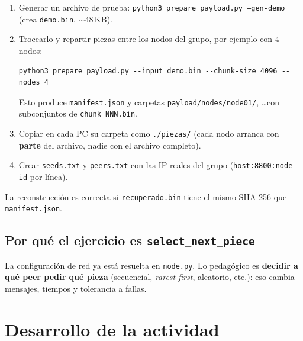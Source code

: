 \documentclass[12pt,a4paper]{article}
\begin{document}
\begin{enumerate}
    \item Generar un archivo de prueba: \texttt{python3 prepare\_payload.py --gen-demo} (crea \texttt{demo.bin}, $\sim$48\,KB).
    \item Trocearlo y repartir piezas entre los nodos del grupo, por ejemplo con 4 nodos:
    \begin{verbatim}
python3 prepare_payload.py --input demo.bin --chunk-size 4096 --nodes 4
    \end{verbatim}
    Esto produce \texttt{manifest.json} y carpetas \texttt{payload/nodes/node01/}, \ldots con subconjuntos de \texttt{chunk\_NNN.bin}.
    \item Copiar en cada PC su carpeta como \texttt{./piezas/} (cada nodo arranca con \textbf{parte} del archivo, nadie con el archivo completo).
    \item Crear \texttt{seeds.txt} y \texttt{peers.txt} con las IP reales del grupo (\texttt{host:8800:node-id} por línea).
\end{enumerate}

La reconstrucción es correcta si \texttt{recuperado.bin} tiene el mismo SHA-256 que \texttt{manifest.json}.

\subsection{Por qué el ejercicio es \texttt{select\_next\_piece}}

La configuración de red ya está resuelta en \texttt{node.py}. Lo pedagógico es \textbf{decidir a qué peer pedir qué pieza} (secuencial, \emph{rarest-first}, aleatorio, etc.): eso cambia mensajes, tiempos y tolerancia a fallas.

\section{Desarrollo de la actividad}
\end{document}
